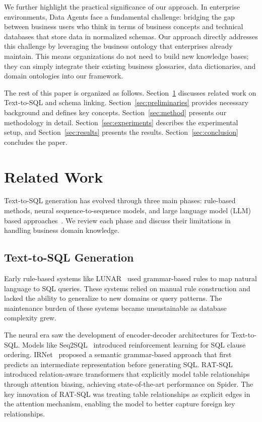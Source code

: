 \documentclass[sigconf, nonatbib]{acmart}
\begin{document}
We further highlight the practical significance of our approach. In enterprise environments, Data Agents face a fundamental challenge: bridging the gap between business users who think in terms of business concepts and technical databases that store data in normalized schemas. Our approach directly addresses this challenge by leveraging the business ontology that enterprises already maintain. This means organizations do not need to build new knowledge bases; they can simply integrate their existing business glossaries, data dictionaries, and domain ontologies into our framework.

The rest of this paper is organized as follows. Section~\ref{sec:related} discusses related work on Text-to-SQL and schema linking. Section~\ref{sec:preliminaries} provides necessary background and defines key concepts. Section~\ref{sec:method} presents our methodology in detail. Section~\ref{sec:experiments} describes the experimental setup, and Section~\ref{sec:results} presents the results. Section~\ref{sec:conclusion} concludes the paper.

\section{Related Work}
\label{sec:related}

Text-to-SQL generation has evolved through three main phases: rule-based methods, neural sequence-to-sequence models, and large language model (LLM) based approaches~\cite{mohammadjafari2024text2sql,liu2024llmtext2sql}. We review each phase and discuss their limitations in handling business domain knowledge.

\subsection{Text-to-SQL Generation}

Early rule-based systems like LUNAR~\cite{woods1978lunar} used grammar-based rules to map natural language to SQL queries. These systems relied on manual rule construction and lacked the ability to generalize to new domains or query patterns. The maintenance burden of these systems became unsustainable as database complexity grew.

The neural era saw the development of encoder-decoder architectures for Text-to-SQL. Models like Seq2SQL~\cite{zhong2017seq2sql} introduced reinforcement learning for SQL clause ordering. IRNet~\cite{guo2019irnet} proposed a semantic grammar-based approach that first predicts an intermediate representation before generating SQL. RAT-SQL~\cite{wang2019rat} introduced relation-aware transformers that explicitly model table relationships through attention biasing, achieving state-of-the-art performance on Spider. The key innovation of RAT-SQL was treating table relationships as explicit edges in the attention mechanism, enabling the model to better capture foreign key relationships.
\end{document}
